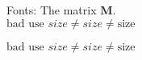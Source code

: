 \documentclass{article}
\begin{document}


Fonts:
The matrix $\mathbf{M}$.			\\




$\text{bad use } size  \neq \mathit{size} \neq \mathrm{size} $

\textit{$\text{bad use } size \neq \mathit{size} \neq \mathrm{size} $}
\end{document}
